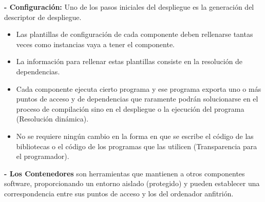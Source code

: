 \documentclass[12pt]{amsart}
\begin{document}
    \textbf{- Configuración:} Uno de los pasos iniciales del despliegue es la generación del descriptor de despliegue.
    
    \begin{itemize}
    
    \item  Las plantillas de configuración de cada componente deben rellenarse tantas veces como instancias vaya a tener el componente.
    
    \item  La información para rellenar estas plantillas consiste en la resolución de dependencias.
    
    \item  Cada componente ejecuta cierto programa y ese programa exporta uno o más puntos de acceso y de dependencias que raramente podrán solucionarse en el proceso de compilación sino en el despliegue o la ejecución del programa (Resolución dinámica).
    
    \item No se requiere ningún cambio en la forma en que se escribe el código de las bibliotecas o el código de los programas que las utilicen (Transparencia para el programador).
    
    \end{itemize}
    
    
    \vfill
    
    \newpage
    
    {\bf - Los Contenedores} son herramientas que mantienen a otros componentes software, proporcionando un entorno aislado (protegido) y pueden establecer una correspondencia entre sus puntos de acceso y los del ordenador anfitrión.
    
\end{document}
